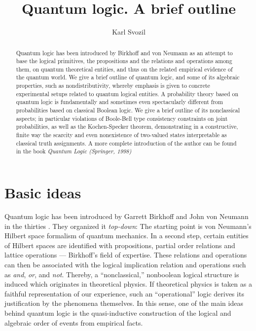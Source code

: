 \documentclass[%
  preprint,
 showpacs,
 showkeys,
 preprintnumbers,
 amsmath,amssymb,
 aps,
 rmp,
  longbibliography,
 ]{revtex4-1}
\begin{document}



\title{Quantum logic. A brief outline}
\author{Karl Svozil}

\begin{abstract}
Quantum logic has been introduced by Birkhoff and von Neumann as an attempt to base the logical primitives, the propositions and the relations and operations among them, on quantum theoretical entities, and thus on the related empirical evidence of the quantum world. We give a brief outline of quantum logic, and some of its algebraic properties, such as nondistributivity, whereby emphasis is given to concrete experimental setups related to quantum logical entities.
A probability theory based on quantum logic is fundamentally and sometimes even spectacularly different from probabilities based on classical Boolean logic. We give a brief outline of its nonclassical aspects; in particular violations of Boole-Bell type consistency constraints on joint probabilities, as well as the Kochen-Specker theorem, demonstrating in a constructive, finite way the scarcity and even nonexistence of two-valued states interpretable as classical truth assignments.
{A more complete introduction of the author can be found in the book {\it Quantum Logic (Springer, 1998)}}
\end{abstract}





\maketitle

\section{Basic ideas}
Quantum logic has been introduced by
Garrett Birkhoff and John von Neumann in the thirties
\cite{birkhoff-36}.
They  organized it {\em top-down}:
The starting point is von Neumann's Hilbert space
formalism of quantum mechanics.
In a second step, certain entities of Hilbert spaces are identified
with propositions,
partial order relations and lattice operations --- Birkhoff's field of
expertise.
These relations and operations can then be
associated with the logical
implication relation and operations such as {\it and}, {\it or}, and
{\it not}. Thereby, a
 ``nonclassical,'' nonboolean
logical structure is induced which originates in theoretical
physics.
If theoretical physics is taken as a faithful
representation of our experience, such an ``operational''
\cite{bridgman27,bridgman,bridgman52}
logic derives
its justification by the phenomena themselves.
In this sense,
one of the main ideas behind quantum logic is the quasi-inductive
construction of the logical and algebraic order of events from empirical
facts.
\end{document}
